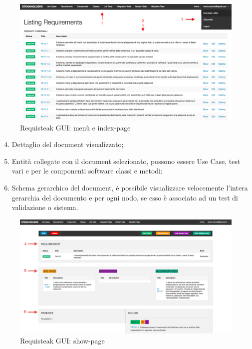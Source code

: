 	 \begin{figure}[H]
		\centering 
		\includegraphics[width=\textwidth]{Requsiteak_GUI_index-page.png}
		\caption{Requisteak GUI: menù e index-page}
		\label{fig:RequisteakGUImenueindexpage}
	 \end{figure}

	 \begin{enumerate}
	 	\setcounter{enumi}{3}
	 	\item Dettaglio del document visualizzato;
	 	\item Entità collegate con il document selezionato, possono essere Use Case, test vari e per le componenti software classi e metodi;
	 	\item Schema gerarchico del document, è possibile visualizzare velocemente l'intera gerarchia del documento e per ogni nodo, se esso è associato ad un test di validazione o sistema. 
	 \end{enumerate}

	 \begin{figure}[H]
		\centering 
		\includegraphics[width=\textwidth]{Requsiteak_GUI_show-page.png}
		\caption{Requisteak GUI: show-page}
		\label{fig:RequisteakGUImenueshowpage}
	 \end{figure}

